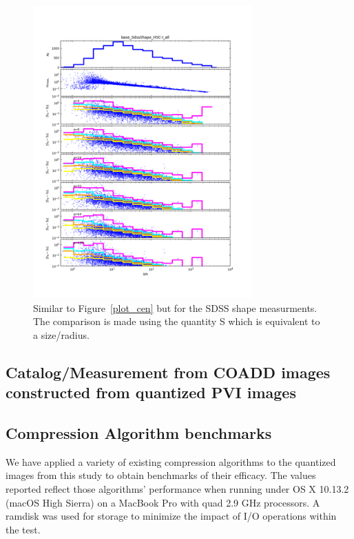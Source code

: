 \begin{figure}
\centering
\includegraphics[width=0.75\textwidth]{figure/rplot_all_base_SdssShape_HSC-I.png}
\caption{Similar to Figure~\ref{plot_cen} but for the SDSS shape measurments.  The comparison is made using the quantity S which is equivalent to
a size/radius.}
\label{plot_shape}
\end{figure}






\subsection{Catalog/Measurement from COADD images constructed from quantized PVI images}


\subsection{Compression Algorithm benchmarks}

We have applied a variety of existing compression algorithms to the quantized images from this study to 
obtain benchmarks of their efficacy.  The values reported reflect those algorithms' performance when
running under OS X 10.13.2 (macOS High Sierra) on a MacBook Pro with quad 2.9 GHz processors.  A ramdisk
was used for storage to minimize the impact of I/O operations within the test.  

